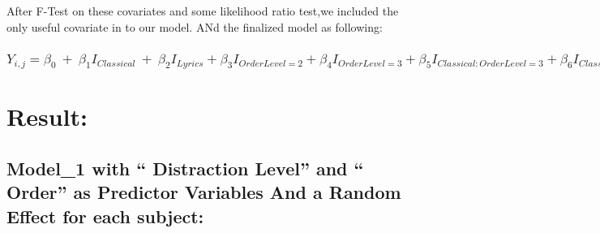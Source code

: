 \documentclass[]{article}
\begin{document}
After F-Test on these covariates and some likelihood ratio test,we
included the only useful covariate in to our model. ANd the finalized
model as following:

\hypertarget{y_ijbeta_0beta_1i_classicalbeta_2i_lyricsbeta_3i_orderlevel2beta_4i_orderlevel3-beta_5i_classicalorderlevel3beta_6i_classicalorderlevel2beta_7i_lyricsorderlevel3beta_8i_lyricsorderlevel2beta_9i_in-ear-no-noise-cancelling-beta_10i_over-ear-no-noise-cancelling-beta_11i_over-ear-yes-noise-cancelling-b_ie_ij}{%
\subsubsection{\texorpdfstring{\(Y_{i,j}=\beta_{0}~+~\beta_1I_{Classical}~+~\beta_2I_{Lyrics}+\beta_3I_{OrderLevel=2}+\beta_4I_{OrderLevel=3}+ \beta_5I_{Classical:OrderLevel=3}+\beta_6I_{Classical:OrderLevel=2}+\beta_7I_{lyrics:OrderLevel=3}+\beta_8I_{lyrics:OrderLevel=2}+\beta_9I_{In ear: No Noise Cancelling }+\beta_10I_{Over ear: No Noise Cancelling }+\beta_11I_{Over ear: Yes Noise Cancelling }+b_i+e_{ij}\)}{Y\_\{i,j\}=\textbackslash beta\_\{0\}\textasciitilde+\textasciitilde\textbackslash beta\_1I\_\{Classical\}\textasciitilde+\textasciitilde\textbackslash beta\_2I\_\{Lyrics\}+\textbackslash beta\_3I\_\{OrderLevel=2\}+\textbackslash beta\_4I\_\{OrderLevel=3\}+ \textbackslash beta\_5I\_\{Classical:OrderLevel=3\}+\textbackslash beta\_6I\_\{Classical:OrderLevel=2\}+\textbackslash beta\_7I\_\{lyrics:OrderLevel=3\}+\textbackslash beta\_8I\_\{lyrics:OrderLevel=2\}+\textbackslash beta\_9I\_\{In ear: No Noise Cancelling \}+\textbackslash beta\_10I\_\{Over ear: No Noise Cancelling \}+\textbackslash beta\_11I\_\{Over ear: Yes Noise Cancelling \}+b\_i+e\_\{ij\}}}\label{y_ijbeta_0beta_1i_classicalbeta_2i_lyricsbeta_3i_orderlevel2beta_4i_orderlevel3-beta_5i_classicalorderlevel3beta_6i_classicalorderlevel2beta_7i_lyricsorderlevel3beta_8i_lyricsorderlevel2beta_9i_in-ear-no-noise-cancelling-beta_10i_over-ear-no-noise-cancelling-beta_11i_over-ear-yes-noise-cancelling-b_ie_ij}}

\hypertarget{result}{%
\section{Result:}\label{result}}

\hypertarget{model_1-with-distraction-level-and-order-as-predictor-variables-and-a-random-effect-for-each-subject-1}{%
\subsection{Model\_1 with `` Distraction Level'' and `` Order'' as
Predictor Variables And a Random Effect for each
subject:}\label{model_1-with-distraction-level-and-order-as-predictor-variables-and-a-random-effect-for-each-subject-1}}
\end{document}
